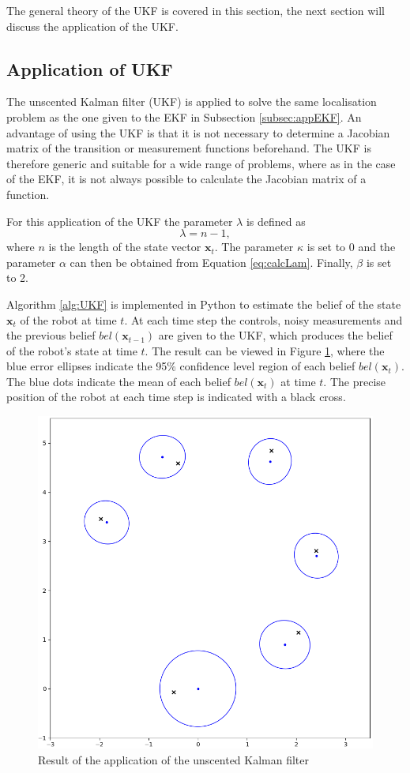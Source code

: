 \documentclass[12pt,oneside,openany,a4paper, %
afrikaans,english,
]{memoir}
\numberwithin{equation}{chapter}
\begin{document}
The general theory of the UKF is covered in this section, the next section will discuss the application of the UKF.
\subsection{Application of UKF}
The unscented Kalman filter (UKF) is applied to solve the same localisation problem as the one given to the EKF in Subsection \ref{subsec:appEKF}. An advantage of using the UKF is that it is not necessary to determine a Jacobian matrix of the transition or measurement functions beforehand. The UKF is therefore generic and suitable for a wide range of problems, where as in the case of the EKF, it is not always possible to calculate the Jacobian matrix of a function.

For this application of the UKF the parameter $\lambda$ is defined as
\begin{equation}
\lambda = n - 1,
\end{equation}
where $n$ is the length of the state vector $\bm{x}_t$. The parameter $\kappa$ is set to 0 and the parameter $\alpha$ can then be obtained from Equation \ref{eq:calcLam}. Finally, $\beta$ is set to 2.

Algorithm \ref{alg:UKF} is implemented in Python to estimate the belief of the state $\bm{x}_t$ of the robot at time $t$.  At each time step the controls, noisy measurements and the previous belief $bel(\bm{x}_{t-1})$ are given to the UKF, which produces the belief of the robot's state at time $t$. The result can be viewed in Figure \ref{fig:resultUKF}, where the blue error ellipses indicate the 95\% confidence level region of each belief $bel(\bm{x}_t)$. The blue dots indicate the mean of each belief $bel(\bm{x}_t)$ at time $t$. The precise position of the robot at each time step is indicated with a black cross.


\begin{figure}[H]
  \includegraphics[width=0.7\linewidth]{Figures/result_UKF.png}
  \centering
  \caption{Result of the application of the unscented Kalman filter}
  \label{fig:resultUKF}
\end{figure}
\end{document}
